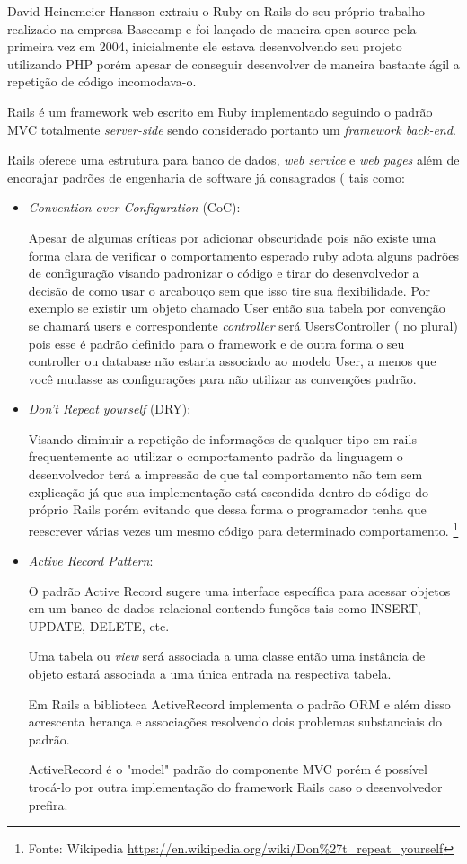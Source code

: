 \par David Heinemeier Hansson extraiu o Ruby on Rails do seu próprio trabalho realizado na empresa Basecamp e foi lançado de maneira open-source pela primeira vez em 2004, inicialmente ele estava desenvolvendo seu projeto utilizando PHP porém apesar de conseguir desenvolver de maneira bastante ágil a repetição de código incomodava-o. \
\par Rails é um framework web escrito em Ruby implementado seguindo o padrão MVC totalmente \emph{server-side} sendo considerado portanto um \emph{framework back-end}.
\par Rails oferece uma estrutura para banco de dados, \emph{web service} e \emph{web pages} além de encorajar padrões de engenharia de software já consagrados ( \cite{railswiki} tais como:
\begin{itemize}
\item {\emph{Convention over Configuration} (CoC):}
    \par Apesar de algumas críticas por adicionar obscuridade pois não existe uma forma clara de verificar o comportamento esperado ruby adota alguns padrões de configuração visando padronizar o código e tirar do desenvolvedor a decisão de como usar o arcabouço sem que isso tire sua flexibilidade. Por exemplo se existir um objeto chamado User então sua tabela por convenção se chamará users e correspondente \emph{controller} será UsersController ( no plural) pois esse é padrão definido para o framework e de outra forma o seu controller ou database não estaria associado ao modelo User, a menos que você mudasse as configurações para não utilizar as convenções padrão.

\item {\emph{Don't Repeat yourself} (DRY):}

    \par Visando diminuir a repetição de informações de qualquer tipo em rails frequentemente ao utilizar o comportamento padrão da linguagem o desenvolvedor terá a impressão de que tal comportamento não tem sem explicação já que sua implementação está escondida dentro do código do próprio Rails porém evitando que dessa forma o programador tenha que reescrever várias vezes um mesmo código para determinado comportamento. \footnote{Fonte: Wikipedia \url{https://en.wikipedia.org/wiki/Don\%27t_repeat_yourself}}

\item { \emph{Active Record Pattern}:}
    \par O padrão Active Record sugere uma interface específica para acessar objetos em um banco de dados relacional contendo funções tais como INSERT, UPDATE, DELETE, etc.
    \par Uma tabela ou \emph{view} será associada a uma classe então uma instância de objeto estará associada a uma única entrada na respectiva tabela.
    \par Em Rails a biblioteca ActiveRecord implementa o padrão ORM e além disso acrescenta herança e associações resolvendo dois problemas substanciais do padrão.
    \par ActiveRecord é o "model" padrão do componente MVC porém é possível trocá-lo por outra implementação do framework Rails caso o desenvolvedor prefira.
\end{itemize}
